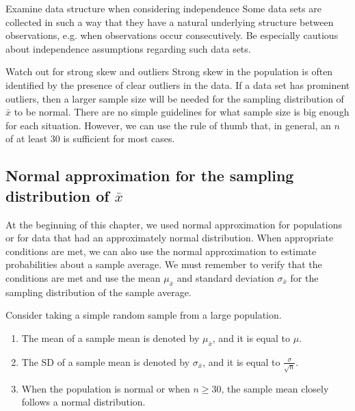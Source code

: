 \begin{caution}{Examine data structure when considering independence}
{Some data sets are collected in such a way that they have a natural underlying structure between observations, e.g. when observations occur consecutively. Be especially cautious about independence assumptions regarding such data sets.}
\end{caution}

\begin{caution}{Watch out for strong skew and outliers}
{Strong skew in the population is often identified by the presence of clear outliers in the data. If a data set has prominent outliers, then a larger sample size will be needed for the sampling distribution of $\bar{x}$ to be normal.  There are no simple guidelines for what sample size is big enough for each situation.  However, we can use the rule of thumb that, in general, an $n$ of at least 30 is sufficient for most cases.}
\end{caution}



\subsection{Normal approximation for the sampling distribution of $\bar{x}$}

At the beginning of this chapter, we used normal approximation for populations or for data that had an approximately normal distribution.  When appropriate conditions are met, we can also use the normal approximation to estimate probabilities about a sample average.  We must remember to verify that the conditions are met and use the mean $\mu_{\bar{x}}$ and standard deviation $\sigma_{\bar{x}}$ for the sampling distribution of the sample average.

\begin{tipBox}{
Consider taking a simple random sample from a large population.
\begin{enumerate}
\setlength{\itemsep}{0mm}
\item The mean of a sample mean is denoted by $\mu_{\bar{x}}$, and it is equal to $\mu$.
\item The SD of a sample mean is denoted by $\sigma_{\bar{x}}$, and it is equal to $\frac{\sigma}{\sqrt{n}}$.
\item When the population is normal or when $n\ge 30$, the sample mean closely follows a normal distribution. 
\end{enumerate}}
\end{tipBox}


